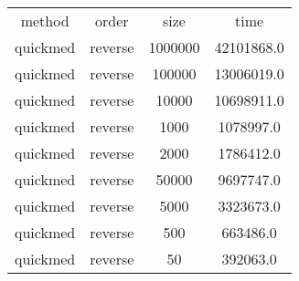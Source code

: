\begin{table}
\begin{tabular}{cccc}
method & order & size & time \\
quickmed & reverse & 1000000 & 42101868.0 \\
quickmed & reverse & 100000 & 13006019.0 \\
quickmed & reverse & 10000 & 10698911.0 \\
quickmed & reverse & 1000 & 1078997.0 \\
quickmed & reverse & 2000 & 1786412.0 \\
quickmed & reverse & 50000 & 9697747.0 \\
quickmed & reverse & 5000 & 3323673.0 \\
quickmed & reverse & 500 & 663486.0 \\
quickmed & reverse & 50 & 392063.0 \\
\end{tabular}
\end{table}
